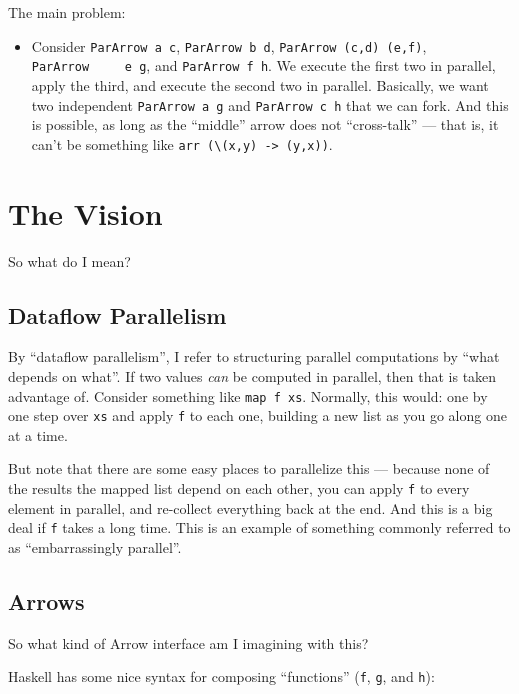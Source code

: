 \documentclass[]{article}
\begin{document}
The main problem:

\begin{itemize}
\tightlist
\item
  Consider \texttt{ParArrow\ a\ c}, \texttt{ParArrow\ b\ d},
  \texttt{ParArrow\ (c,d)\ (e,f)}, \texttt{ParArrow\ \ \ \ \ e\ g}, and
  \texttt{ParArrow\ f\ h}. We execute the first two in parallel, apply the
  third, and execute the second two in parallel. Basically, we want two
  independent \texttt{ParArrow\ a\ g} and \texttt{ParArrow\ c\ h} that we can
  fork. And this is possible, as long as the ``middle'' arrow does not
  ``cross-talk'' --- that is, it can't be something like
  \texttt{arr\ (\textbackslash{}(x,y)\ -\textgreater{}\ (y,x))}.
\end{itemize}

\section{The Vision}\label{the-vision}

So what do I mean?

\subsection{Dataflow Parallelism}\label{dataflow-parallelism}

By ``dataflow parallelism'', I refer to structuring parallel computations by
``what depends on what''. If two values \emph{can} be computed in parallel, then
that is taken advantage of. Consider something like \texttt{map\ f\ xs}.
Normally, this would: one by one step over \texttt{xs} and apply \texttt{f} to
each one, building a new list as you go along one at a time.

But note that there are some easy places to parallelize this --- because none of
the results the mapped list depend on each other, you can apply \texttt{f} to
every element in parallel, and re-collect everything back at the end. And this
is a big deal if \texttt{f} takes a long time. This is an example of something
commonly referred to as ``embarrassingly parallel''.

\subsection{Arrows}\label{arrows}

So what kind of Arrow interface am I imagining with this?

Haskell has some nice syntax for composing ``functions'' (\texttt{f},
\texttt{g}, and \texttt{h}):
\end{document}
